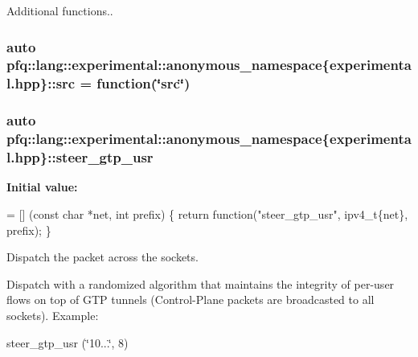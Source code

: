 Additional functions.. 

\subsubsection[{\texorpdfstring{src}{src}}]{\setlength{\rightskip}{0pt plus 5cm}auto pfq\+::lang\+::experimental\+::anonymous\+\_\+namespace\{experimental.\+hpp\}\+::src = {\bf function}(\char`\"{}src\char`\"{})}\hypertarget{namespacepfq_1_1lang_1_1experimental_1_1anonymous__namespace_02experimental_8hpp_03_a9a26dd399154b70de7ed3da9015931fe}{}\label{namespacepfq_1_1lang_1_1experimental_1_1anonymous__namespace_02experimental_8hpp_03_a9a26dd399154b70de7ed3da9015931fe}
\subsubsection[{\texorpdfstring{steer\+\_\+gtp\+\_\+usr}{steer_gtp_usr}}]{\setlength{\rightskip}{0pt plus 5cm}auto pfq\+::lang\+::experimental\+::anonymous\+\_\+namespace\{experimental.\+hpp\}\+::steer\+\_\+gtp\+\_\+usr}\hypertarget{namespacepfq_1_1lang_1_1experimental_1_1anonymous__namespace_02experimental_8hpp_03_a6b08a2b49251677736f1939eaadac4a6}{}\label{namespacepfq_1_1lang_1_1experimental_1_1anonymous__namespace_02experimental_8hpp_03_a6b08a2b49251677736f1939eaadac4a6}
{\bfseries Initial value\+:}
\begin{DoxyCode}
= [] (\textcolor{keyword}{const} \textcolor{keywordtype}{char} *net, \textcolor{keywordtype}{int} prefix)
        \{
            \textcolor{keywordflow}{return} \textcolor{keyword}{function}(\textcolor{stringliteral}{"steer\_gtp\_usr"}, ipv4\_t\{net\}, prefix);
        \}
\end{DoxyCode}


Dispatch the packet across the sockets. 

Dispatch with a randomized algorithm that maintains the integrity of per-\/user flows on top of G\+TP tunnels (Control-\/\+Plane packets are broadcasted to all sockets). Example\+:

steer\+\_\+gtp\+\_\+usr (\char`\"{}10...\char`\"{}, 8) 